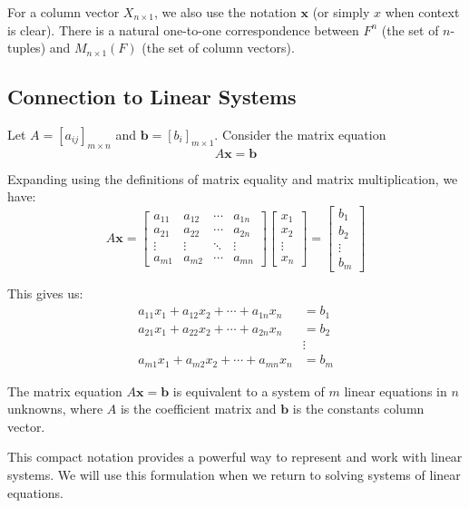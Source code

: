 \begin{notation}
    For a column vector $X_{n \times 1}$, we also use the notation $\mathbf{x}$ (or simply $x$ when context is clear). There is a natural one-to-one correspondence between $F^n$ (the set of $n$-tuples) and $M_{n \times 1}(F)$ (the set of column vectors).
\end{notation}

\subsection{Connection to Linear Systems}

Let $A = [a_{ij}]_{m \times n}$ and $\mathbf{b} = [b_i]_{m \times 1}$. Consider the matrix equation
\[
A\mathbf{x} = \mathbf{b}
\]

Expanding using the definitions of matrix equality and matrix multiplication, we have:
\[
A\mathbf{x} = \begin{bmatrix}
a_{11} & a_{12} & \cdots & a_{1n} \\
a_{21} & a_{22} & \cdots & a_{2n} \\
\vdots & \vdots & \ddots & \vdots \\
a_{m1} & a_{m2} & \cdots & a_{mn}
\end{bmatrix}
\begin{bmatrix}
x_1 \\ x_2 \\ \vdots \\ x_n
\end{bmatrix}
=
\begin{bmatrix}
b_1 \\ b_2 \\ \vdots \\ b_m
\end{bmatrix}
\]

This gives us:
\begin{align*}
a_{11}x_1 + a_{12}x_2 + \cdots + a_{1n}x_n &= b_1 \\
a_{21}x_1 + a_{22}x_2 + \cdots + a_{2n}x_n &= b_2 \\
&\vdots \\
a_{m1}x_1 + a_{m2}x_2 + \cdots + a_{mn}x_n &= b_m
\end{align*}

\begin{theorem}\label{thm:matrix-linear-system}
    The matrix equation $A\mathbf{x} = \mathbf{b}$ is equivalent to a system of $m$ linear equations in $n$ unknowns, where $A$ is the coefficient matrix and $\mathbf{b}$ is the constants column vector.
\end{theorem}

\begin{note}
    This compact notation provides a powerful way to represent and work with linear systems. We will use this formulation when we return to solving systems of linear equations.
\end{note}